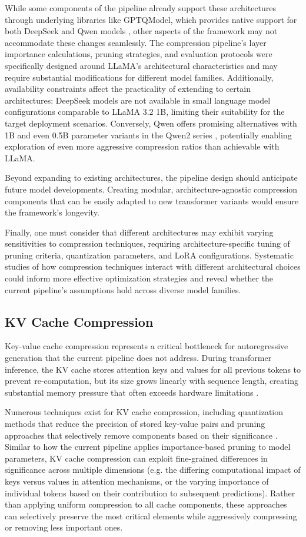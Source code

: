 While some components of the pipeline already support these architectures through underlying libraries like GPTQModel, which provides native support for both DeepSeek and Qwen models \cite{gptqmodel}, other aspects of the framework may not accommodate these changes seamlessly. The compression pipeline's layer importance calculations, pruning strategies, and evaluation protocols were specifically designed around LLaMA's architectural characteristics and may require substantial modifications for different model families. Additionally, availability constraints affect the practicality of extending to certain architectures: DeepSeek models are not available in small language model configurations comparable to LLaMA 3.2 1B, limiting their suitability for the target deployment scenarios. Conversely, Qwen offers promising alternatives with 1B and even 0.5B parameter variants in the Qwen2 series \cite{qwen2}, potentially enabling exploration of even more aggressive compression ratios than achievable with LLaMA.

Beyond expanding to existing architectures, the pipeline design should anticipate future model developments. Creating modular, architecture-agnostic compression components that can be easily adapted to new transformer variants would ensure the framework's longevity.

Finally, one must consider that different architectures may exhibit varying sensitivities to compression techniques, requiring architecture-specific tuning of pruning criteria, quantization parameters, and LoRA configurations. Systematic studies of how compression techniques interact with different architectural choices could inform more effective optimization strategies and reveal whether the current pipeline's assumptions hold across diverse model families.

\subsection{KV Cache Compression}
Key-value cache compression represents a critical bottleneck for autoregressive generation that the current pipeline does not address. During transformer inference, the KV cache stores attention keys and values for all previous tokens to prevent re-computation, but its size grows linearly with sequence length, creating substantial memory pressure that often exceeds hardware limitations \cite{kvcompr}.

Numerous techniques exist for KV cache compression, including quantization methods that reduce the precision of stored key-value pairs and pruning approaches that selectively remove components based on their significance \cite{kvcompr2}. Similar to how the current pipeline applies importance-based pruning to model parameters, KV cache compression can exploit fine-grained differences in significance across multiple dimensions (e.g. the differing computational impact of keys versus values in attention mechanisms, or the varying importance of individual tokens based on their contribution to subsequent predictions). Rather than applying uniform compression to all cache components, these approaches can selectively preserve the most critical elements while aggressively compressing or removing less important ones.

